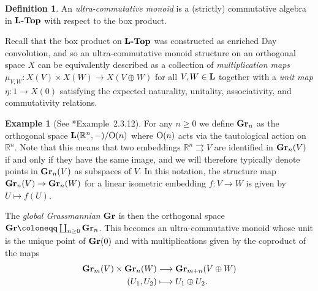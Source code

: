 \documentclass[reqno]{memo-l}
\theoremstyle{mythm}
\theoremstyle{definition}
\newtheorem{ex}[thm]{Example}
\newtheorem{definition}[thm]{Definition}
\numberwithin{equation}{section}
\newcommand{\R} {{\mathbb{R}}}
\newcommand{\cat}[1]{\textbf{\textup{#1}}}
\renewcommand{\O}{{\textup{O}}}
\begin{document}
\begin{definition}
    An \emph{ultra-commutative monoid} is a (strictly) commutative algebra in $\cat{$\cat{L}$-Top}$ with respect to the box product.
\end{definition}

Recall that the box product on $\cat{$\cat{L}$-Top}$ was constructed as enriched Day convolution, and so an ultra-commutative monoid structure on an orthogonal space $X$ can be equivalently described as a collection of \emph{multiplication maps} $\mu_{V,W}\colon X(V)\times X(W)\to X(V\oplus W)$ for all $V,W\in\cat{L}$ together with a \emph{unit map} $\eta\colon 1\to X(0)$ satisfying the expected naturality, unitality, associativity, and commutativity relations.

\begin{ex}[See \cite{schwede2018global}*{Example~2.3.12}]
    For any $n\ge0$ we define $\cat{Gr}_n$ as the orthogonal space $\cat{L}(\R^n,-)/\O(n)$ where $\O(n)$ acts via the tautological action on $\R^n$. Note that this means that two embeddings $\R^n\rightrightarrows V$ are identified in $\cat{Gr}_n(V)$ if and only if they have the same image, and we will therefore typically denote points in $\cat{Gr}_n(V)$ as subspaces of $V$. In this notation, the structure map $\cat{Gr}_n(V)\to\cat{Gr}_n(W)$ for a linear isometric embedding $f\colon V\to W$ is given by $U\mapsto f(U)$.

    The \emph{global Grassmannian} $\cat{Gr}$ is then the orthogonal space $\cat{Gr}\coloneqq\coprod_{n\ge0}\cat{Gr}_n$. This becomes an ultra-commutative monoid whose unit is the unique point of $\cat{Gr}(0)$ and with multiplications given by the coproduct of the maps
    \begin{align*}
        \cat{Gr}_m(V)\times\cat{Gr}_n(W)&\longrightarrow\cat{Gr}_{m+n}(V\oplus W)\\
        (U_1,U_2)&\longmapsto U_1\oplus U_2.
    \end{align*}
\end{ex}
\end{document}
